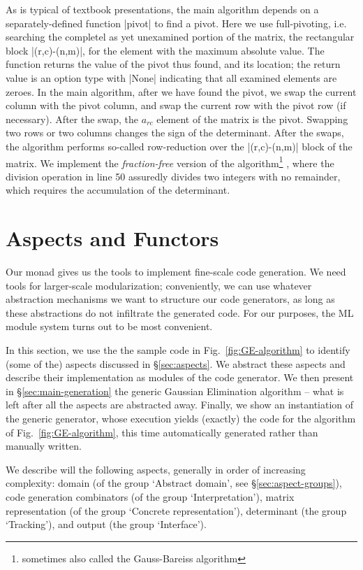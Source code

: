 \documentclass{elsart}
\begin{document}
As is typical of textbook presentations, the main algorithm depends on
a separately-defined function |pivot| to find a pivot. Here we use
full-pivoting, i.e. searching the completel as yet unexamined portion of the
matrix, the rectangular block |(r,c)-(n,m)|, for the element with the 
maximum absolute value. The function returns the value of the
pivot thus found, and its location; the return value is an option type with
|None| indicating that all examined elements are zeroes. In the main
algorithm, after we have found the pivot, we swap the current column 
with the pivot column, and swap the current row with the pivot row (if
necessary). 
After the swap, the $a_{rc}$ element of the matrix is the pivot.
Swapping two rows or two columns changes the sign of the determinant.
After the swaps, the algorithm performs so-called row-reduction
over the |(r,c)-(n,m)| block of the matrix.
We implement the \emph{fraction-free} version of the
algorithm\footnote{sometimes also called the Gauss-Bareiss algorithm}
\cite{Bareiss68},
where the division operation in line 50 assuredly divides two integers
with no remainder, which requires the accumulation
of the determinant.

\section{Aspects and Functors}\label{functors}

Our monad gives us the tools to implement fine-scale code generation. We need
tools for larger-scale modularization; conveniently, we can use whatever
abstraction mechanisms we want to structure our code generators, as long as
these abstractions do not infiltrate the generated code. For our purposes, the
ML module system turns out to be most convenient.

In this section, we use the the sample code in
Fig.~\ref{fig:GE-algorithm} to identify (some of the) aspects
discussed in \S\ref{sec:aspects}. We abstract these aspects and
describe their implementation as modules of the code generator.  We
then present in \S\ref{sec:main-generation} the generic Gaussian
Elimination algorithm -- what is left after all the aspects are
abstracted away. Finally, we show an instantiation of the generic
generator, whose execution yields (exactly) the code for the algorithm of
Fig.~\ref{fig:GE-algorithm}, this time automatically generated rather
than manually written.

We describe will the following aspects, generally in
order of increasing complexity: domain (of the group `Abstract
domain', see \S\ref{sec:aspect-groups}), code generation combinators
(of the group `Interpretation'), matrix representation (of the group
`Concrete representation'), determinant (the group `Tracking'), and
output (the group `Interface').
\end{document}

